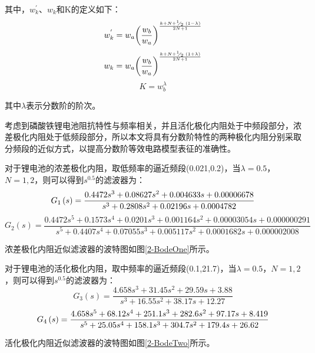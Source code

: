 其中，$w_{k}^{'}$、${{w}_{k}}$和K的定义如下：
\begin{equation}
w_{k}^{'}={{w}_{a}}{{\left( \frac{{{w}_{b}}}{{{w}_{a}}} \right)}^{\frac{k+N+{}^{1}\!\!\diagup\!\!{}_{2}\;\left( 1-\lambda  \right)}{2N+1}}}
\end{equation}
\begin{equation}
{{w}_{k}}={{w}_{a}}{{\left( \frac{{{w}_{b}}}{{{w}_{a}}} \right)}^{\frac{k+N+{}^{1}\!\!\diagup\!\!{}_{2}\;\left( 1+\lambda  \right)}{2N+1}}}
\end{equation}
\begin{equation}
K=w_{b}^{\lambda }
\end{equation}

其中$\lambda $表示分数阶的阶次。

考虑到磷酸铁锂电池阻抗特性与频率相关，并且活化极化内阻处于中频段部分，浓差极化内阻处于低频段部分，所以本文将具有分数阶特性的两种极化内阻分别采取分频段的近似方式，以提高分数阶等效电路模型表征的准确性。

对于锂电池的浓差极化内阻，取低频率的逼近频段(0.021,0.2)，当$\lambda =0.5$，$N=1,2$，则可以得到${{s}^{0.5}}$的滤波器为：
\begin{equation}
{G_1}\left( s \right) = \frac{{0.4472{s^3} + 0.08627{s^2} + 0.004633s + 0.00006678}}{{{s^3} + 0.2808{s^2} + 0.02196s + {\rm{0}}{\rm{.0004782}}}}
\end{equation}
\begin{equation}
{G_2}\left( s \right) = \frac{{0.4472{s^5} + 0.1573{s^4} + 0.0201{s^3} + 0.001164{s^2} + 0.00003054s + 0.000000291}}{{{s^5} + 0.4407{s^4} + 0.07055{s^3} + 0.005117{s^2} + 0.0001682s + 0.000002008}}
\end{equation}

浓差极化内阻近似滤波器的波特图如图\ref{2-BodeOne}所示。

对于锂电池的活化极化内阻，取中频率的逼近频段(0.1,21.7)，当$\lambda =0.5$，$N=1,2$，则可以得到${{s}^{0.5}}$的滤波器为：
\begin{equation}
{G_3}\left( s \right) = \frac{{4.658{s^3} + 31.45{s^2} + 29.59s + 3.88}}{{{s^3} + 16.55{s^2} + 38.17s + 12.27}}
\end{equation}
\begin{equation}
{G_4}\left( s \right) = \frac{{4.658{s^5} + 68.12{s^4} + 251.1{s^3} + 282.6{s^2} + 97.17s + 8.419}}{{{s^5} + 25.05{s^4} + 158.1{s^3} + 304.7{s^2} + 179.{\rm{4}}s + 26.62}}
\end{equation}

活化极化内阻近似滤波器的波特图如图\ref{2-BodeTwo}所示。

